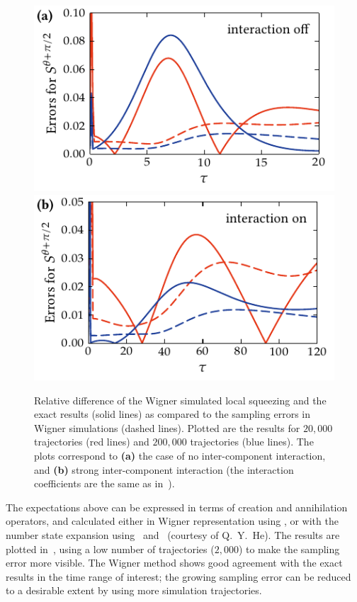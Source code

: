 \begin{figure}
    \centerline{%
    \includegraphics{figures_generated/exact/squeezing_nocc_err.pdf}%
    \includegraphics{figures_generated/exact/squeezing_cc_err.pdf}}

    \caption{
    Relative difference of the Wigner simulated local squeezing and the exact results (solid lines) as compared to the sampling errors in Wigner simulations (dashed lines).
    Plotted are the results for $20,000$ trajectories (red lines) and $200,000$ trajectories (blue lines).
    The plots correspond to \textbf{(a)} the case of no inter-component interaction, and \textbf{(b)} strong inter-component interaction (the interaction coefficients are the same as in~).}%

    \label{fig:wigner-bec:mm:squeezing-error-comparison}
\end{figure}

The expectations above can be expressed in terms of creation and annihilation operators, and calculated either in Wigner representation using , or with the number state expansion using~ and~ (courtesy of Q.~Y.~He).
The results are plotted in~, using a low number of trajectories ($2,000$) to make the sampling error more visible.
The Wigner method shows good agreement with the exact results in the time range of interest; the growing sampling error can be reduced to a desirable extent by using more simulation trajectories.

